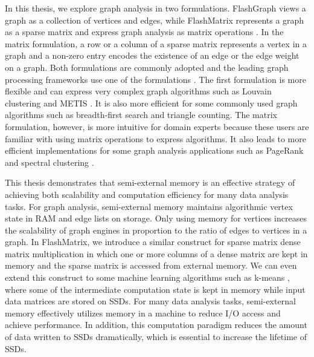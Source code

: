 In this thesis, we explore graph analysis in two formulations. FlashGraph views
a graph as a collection of vertices and edges, while FlashMatrix represents
a graph as a sparse matrix and express graph analysis as matrix operations
\cite{Mattson13}. In the matrix formulation, a row or a column of a sparse
matrix represents a vertex in a graph and a non-zero entry encodes the existence
of an edge or the edge weight on a graph. Both formulations are commonly adopted
and the leading graph processing frameworks use one of the formulations
\cite{pregel, powergraph, graphx, graphchi, xstream, pegasus, heigen}.
The first formulation is more flexible and can express very complex graph
algorithms such as Louvain clustering \cite{louvain} and METIS \cite{metis}.
It is also more efficient for some commonly used graph algorithms such as
breadth-first search and triangle counting. The matrix formulation, however,
is more intuitive for domain experts because these users are familiar with
using matrix operations to express algorithms. It also leads to more efficient
implementations for some graph analysis applications such as PageRank
\cite{pagerank} and spectral clustering \cite{spectral}.

This thesis demonstrates that semi-external memory is an effective strategy of
achieving both scalability and computation efficiency for many data analysis tasks.
For graph analysis, semi-external memory \cite{Abello98} maintains algorithmic
vertex state in RAM and edge lists on storage. Only using memory for vertices
increases the scalability of graph engines in proportion to the ratio of edges
to vertices in a graph. In FlashMatrix, we introduce a similar construct for
sparse matrix dense matrix multiplication in which one or more columns of
a dense matrix are kept in memory and the sparse matrix is accessed from
external memory. We can even extend this construct to some machine learning
algorithms such as k-means \cite{kmeans}, where some of the intermediate
computation state is kept in memory while input data matrices are stored on
SSDs. For many data analysis tasks, semi-external memory effectively utilizes
memory in a machine to reduce I/O access and achieve performance. In addition,
this computation paradigm reduces the amount of data written to SSDs
dramatically, which is essential to increase the lifetime of SSDs.

